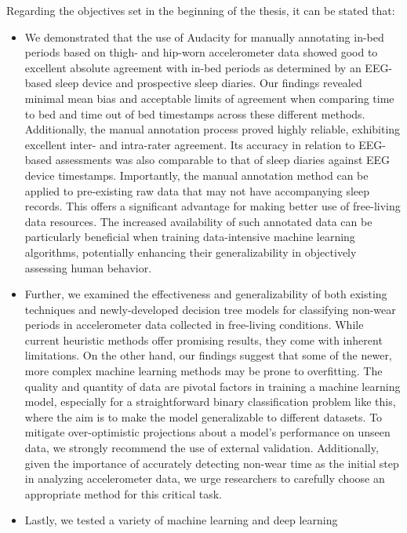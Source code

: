 \documentclass[
  10pt,
]{scrbook}
\begin{document}
Regarding the objectives set in the beginning of the thesis, it can be
stated that:

\begin{itemize}
\item
  We demonstrated that the use of Audacity for manually annotating
  in-bed periods based on thigh- and hip-worn accelerometer data showed
  good to excellent absolute agreement with in-bed periods as determined
  by an EEG-based sleep device and prospective sleep diaries. Our
  findings revealed minimal mean bias and acceptable limits of agreement
  when comparing time to bed and time out of bed timestamps across these
  different methods. Additionally, the manual annotation process proved
  highly reliable, exhibiting excellent inter- and intra-rater
  agreement. Its accuracy in relation to EEG-based assessments was also
  comparable to that of sleep diaries against EEG device timestamps.
  Importantly, the manual annotation method can be applied to
  pre-existing raw data that may not have accompanying sleep records.
  This offers a significant advantage for making better use of
  free-living data resources. The increased availability of such
  annotated data can be particularly beneficial when training
  data-intensive machine learning algorithms, potentially enhancing
  their generalizability in objectively assessing human behavior.
\item
  Further, we examined the effectiveness and generalizability of both
  existing techniques and newly-developed decision tree models for
  classifying non-wear periods in accelerometer data collected in
  free-living conditions. While current heuristic methods offer
  promising results, they come with inherent limitations. On the other
  hand, our findings suggest that some of the newer, more complex
  machine learning methods may be prone to overfitting. The quality and
  quantity of data are pivotal factors in training a machine learning
  model, especially for a straightforward binary classification problem
  like this, where the aim is to make the model generalizable to
  different datasets. To mitigate over-optimistic projections about a
  model's performance on unseen data, we strongly recommend the use of
  external validation. Additionally, given the importance of accurately
  detecting non-wear time as the initial step in analyzing accelerometer
  data, we urge researchers to carefully choose an appropriate method
  for this critical task.
\item
  Lastly, we tested a variety of machine learning and deep learning

\end{itemize}
\end{document}
